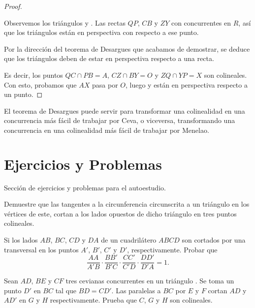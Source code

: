 \begin{proof}
\begin{multicols}{2}
    Observemos los triángulos  y .
    Las rectas $QP$, $CB$ y $ZY$ con concurrentes en $R$, así que los triángulos están en perspectiva con respecto a ese punto.

    Por la dirección del teorema de Desargues que acabamos de demostrar, se deduce que los triángulos deben de estar en perspectiva respecto a una recta.
    \end{multicols}
    \vspace{-6mm}
    Es decir, los puntos $QC \cap PB = A$, $CZ \cap BY = O$ y $ZQ \cap YP = X$ son colineales.
    Con esto, probamos que $AX$ pasa por $O$, luego  y  están en perspectiva respecto a un punto.
\end{proof}
\begin{remark.tcb}
    El teorema de Desargues puede servir para transformar una colinealidad en una concurrencia más fácil de trabajar por Ceva, o viceversa, transformando una concurrencia en una colinealidad más fácil de trabajar por Menelao.
\end{remark.tcb}





\section{Ejercicios y Problemas}
Sección de ejercicios y problemas para el autoestudio.
\begin{section-problem}
    Demuestre que las tangentes a la circunferencia circunscrita a un triángulo en los vértices de este, cortan a los lados opuestos de dicho triángulo en tres puntos colineales.
\end{section-problem}

\begin{section-problem}
    Si los lados $AB$, $BC$, $CD$ y $DA$ de un cuadrilátero $ABCD$ son cortados por una transversal en los puntos $A'$, $B'$, $C'$ y $D'$, respectivamente.
    Probar que
    \[
        \dfrac{AA}{A'B} \cdot \dfrac{BB'}{B'C} \cdot \dfrac{CC'}{C'D} \cdot \dfrac{DD'}{D'A} = 1.
    \]
\end{section-problem}

\begin{section-problem}
    Sean $AD$, $BE$ y $CF$ tres cevianas concurrentes en un triángulo .
    Se toma un punto $D'$ en $BC$ tal que $BD = CD'$.
    Las paralelas a $BC$ por $E$ y $F$ cortan $AD$ y $AD'$ en $G$ y $H$ respectivamente.
    Prueba que $C$, $G$ y $H$ son colineales.
\end{section-problem}

